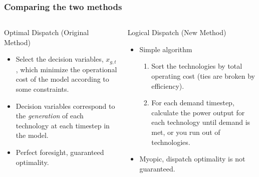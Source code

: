 \begin{frame}
    \frametitle{Comparing the two methods}

    \begin{columns}
        
        \column[t]{5cm}

        \begin{block}{Optimal Dispatch (Original Method)}
            \begin{itemize}[<+->]
                \item Select the decision variables, $x_{g,t}$, which minimize
                the operational cost of the model according to some constraints.
                \item Decision variables correspond to the \textit{generation}
                of each technology at each timestep in the model.
                \item Perfect foresight, guaranteed optimality.
            \end{itemize}
        \end{block}
        \column[t]{5cm}
        \begin{block}{Logical Dispatch (New Method)}
            \begin{itemize}[<+->]
                \item Simple algorithm
            \begin{enumerate}
                \item Sort the technologies by total operating cost (ties are
                broken by efficiency).
                \item For each demand timestep, calculate the power output for
                each technology until demand is met, or you run out of
                technologies.
            \end{enumerate}
            \item Myopic, dispatch optimality is not guaranteed.
            \end{itemize}
        \end{block}
    \end{columns}

\end{frame}


        

